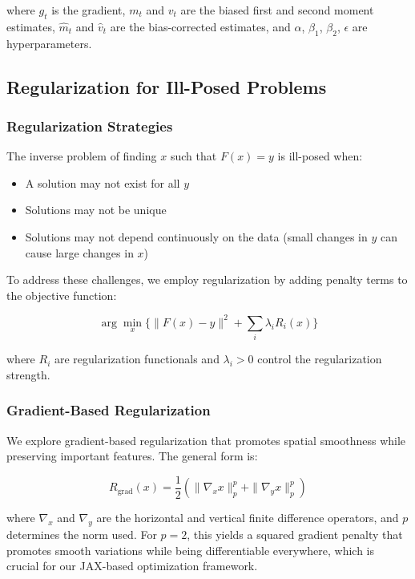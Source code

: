 \documentclass[nomenclature, english, bibtex]{kththesis}
\numberwithin{listing}{chapter}
\begin{document}
where $g_t$ is the gradient, $m_t$ and $v_t$ are the biased first and second moment estimates, $\hat{m}_t$ and $\hat{v}_t$ are the bias-corrected estimates, and $\alpha$, $\beta_1$, $\beta_2$, $\epsilon$ are hyperparameters.

\subsection{Regularization for Ill-Posed Problems}
\subsubsection{Regularization Strategies}
The inverse problem of finding $x$ such that $F(x) = y$ is ill-posed when:
\begin{itemize}
    \item A solution may not exist for all $y$
    \item Solutions may not be unique
    \item Solutions may not depend continuously on the data (small changes in $y$ can cause large changes in $x$)
\end{itemize}

To address these challenges, we employ regularization by adding penalty terms to the objective function:

\begin{equation}
\arg\min_x \{\|F(x) - y\|^2 + \sum_{i} \lambda_i R_i(x)\}
\end{equation}

where $R_i$ are regularization functionals and $\lambda_i > 0$ control the regularization strength.

\subsubsection{Gradient-Based Regularization}
We explore gradient-based regularization that promotes spatial smoothness while preserving important features. The general form is:

\begin{equation}
R_{\text{grad}}(x) = \frac{1}{2} \left( \|\nabla_x x\|_p^p + \|\nabla_y x\|_p^p \right)
\end{equation}

where $\nabla_x$ and $\nabla_y$ are the horizontal and vertical finite difference operators, and $p$ determines the norm used. For $p=2$, this yields a squared gradient penalty that promotes smooth variations while being differentiable everywhere, which is crucial for our JAX-based optimization framework.
\end{document}
